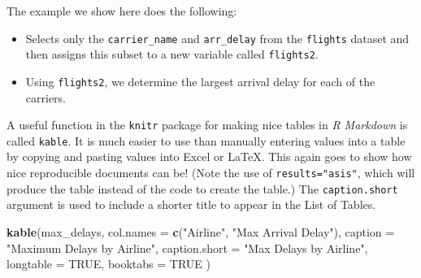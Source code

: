 \documentclass[12pt,twoside]{reedthesis}
\newenvironment{Shaded}{\begin{snugshade}}{\end{snugshade}}
\newcommand{\DataTypeTok}[1]{\textcolor[rgb]{0.13,0.29,0.53}{#1}}
\newcommand{\KeywordTok}[1]{\textcolor[rgb]{0.13,0.29,0.53}{\textbf{#1}}}
\newcommand{\NormalTok}[1]{#1}
\newcommand{\OperatorTok}[1]{\textcolor[rgb]{0.81,0.36,0.00}{\textbf{#1}}}
\newcommand{\OtherTok}[1]{\textcolor[rgb]{0.56,0.35,0.01}{#1}}
\newcommand{\StringTok}[1]{\textcolor[rgb]{0.31,0.60,0.02}{#1}}
\begin{document}
The example we show here does the following:
\begin{itemize}
\item
  Selects only the \texttt{carrier\_name} and \texttt{arr\_delay} from the \texttt{flights} dataset and then assigns this subset to a new variable called \texttt{flights2}.
\item
  Using \texttt{flights2}, we determine the largest arrival delay for each of the carriers.
\end{itemize}
\begin{Shaded}
\end{Shaded}
A useful function in the \texttt{knitr} package for making nice tables in \emph{R Markdown} is called \texttt{kable}. It is much easier to use than manually entering values into a table by copying and pasting values into Excel or LaTeX. This again goes to show how nice reproducible documents can be! (Note the use of \texttt{results="asis"}, which will produce the table instead of the code to create the table.) The \texttt{caption.short} argument is used to include a shorter title to appear in the List of Tables.
\begin{Shaded}
\begin{Highlighting}[]
\KeywordTok{kable}\NormalTok{(max_delays,}
  \DataTypeTok{col.names =} \KeywordTok{c}\NormalTok{(}\StringTok{"Airline"}\NormalTok{, }\StringTok{"Max Arrival Delay"}\NormalTok{),}
  \DataTypeTok{caption =} \StringTok{"Maximum Delays by Airline"}\NormalTok{,}
  \DataTypeTok{caption.short =} \StringTok{"Max Delays by Airline"}\NormalTok{,}
  \DataTypeTok{longtable =} \OtherTok{TRUE}\NormalTok{,}
  \DataTypeTok{booktabs =} \OtherTok{TRUE}
\NormalTok{)}
\end{Highlighting}
\end{Shaded}
\end{document}
